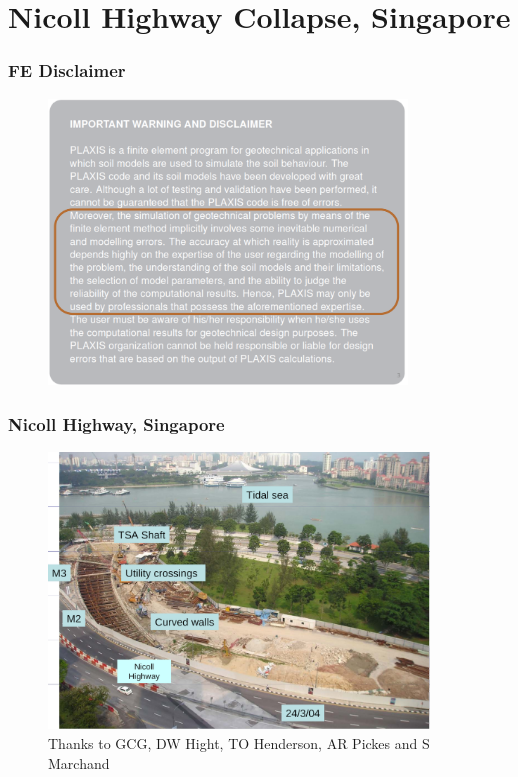 \documentclass[notes]{beamer}
\begin{document}
\section{Nicoll Highway Collapse, Singapore}
\begin{frame}
\frametitle{FE Disclaimer}
\begin{figure}[ht]
	\centering
	\includegraphics[width=0.85\textwidth]{figs/plaxis-disclaimer.png}
\end{figure}
\end{frame}
\begin{frame}
\frametitle{Nicoll Highway, Singapore}
\begin{figure}[ht]
	\centering
	\includegraphics[width=0.9\textwidth]{figs/nicoll-highway.png}
	\caption{Thanks to GCG, DW Hight, TO Henderson, AR Pickes and S Marchand }
\end{figure}
\end{frame}
\end{document}
